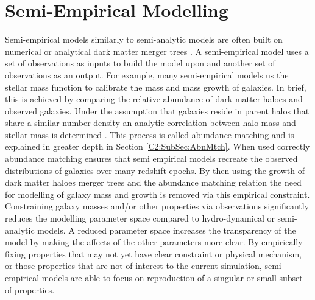 \section{Semi-Empirical Modelling}
\label{sec:SEM}
Semi-empirical models similarly to semi-analytic models are often built on numerical or analytical dark matter merger trees \cite{Zavala2012}. A semi-empirical model uses a set of observations as inputs to build the model upon and another set of observations as an output. 
For example, many semi-empirical models us the stellar mass function to calibrate the mass and mass growth of galaxies. In brief, this is achieved by comparing the relative abundance of dark matter haloes and observed galaxies. Under the assumption that galaxies reside in parent halos that share a similar number density an analytic correlation between halo mass and stellar mass is determined \citep{Kravtsov2004TheDistribution,Shankar2006NewFormation}. This process is called abundance matching and is explained in greater depth in Section \ref{C2:SubSec:AbnMtch}. When used correctly abundance matching ensures that semi empirical models recreate the observed distributions of galaxies over many redshift epochs. By then using the growth of dark matter haloes merger trees and the abundance matching relation the need for modelling of galaxy mass and growth is removed via this empirical constraint. Constraining galaxy masses and/or other properties via observations significantly reduces the modelling parameter space compared to hydro-dynamical or semi-analytic models. A reduced parameter space increases the transparency of the model by making the affects of the other parameters more clear. By empirically fixing properties that may not yet have clear constraint or physical mechanism, or those properties that are not of interest to the current simulation, semi-empirical models are able to focus on reproduction of a singular or small subset of properties.

